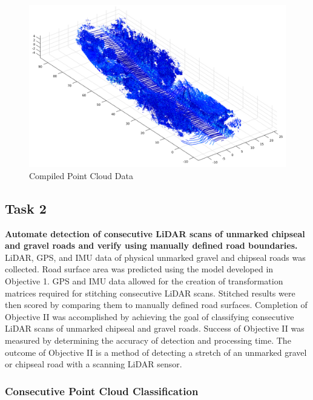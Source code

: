 \documentclass[numbered,pdftex]{ohio-etd}
\begin{document}
{{{{				\begin{figure}[H]
					\centering
					\includegraphics[width=0.7\linewidth]{Defense_Images/Compiled_PCD}
					\caption[Compiled Point Cloud Data]{Compiled Point Cloud Data}
					\label{fig:Compiled_PCD}
				\end{figure}
				
			} %

		
		} %
		
		\subsection{Task 2}\label{sec:Objective_2_Task_2}{
		
			{\textbf{Automate detection of consecutive LiDAR scans of unmarked chipseal and gravel roads and verify using manually defined road boundaries.} LiDAR, GPS, and IMU data of physical unmarked gravel and chipseal roads was collected. Road surface area was predicted using the model developed in Objective 1. GPS and IMU data allowed for the creation of transformation matrices required for stitching consecutive LiDAR scans. Stitched results were then scored by comparing them to manually defined road surfaces. Completion of Objective II was accomplished by achieving the goal of classifying consecutive LiDAR scans of unmarked chipseal and gravel roads. Success of Objective II was measured by determining the accuracy of detection and processing time. The outcome of Objective II is a method of detecting a stretch of an unmarked gravel or chipseal road with a scanning LiDAR sensor.}
			
			\subsubsection{Consecutive Point Cloud Classification}\label{sec:consecutive_point_cloud_classification}{
			
}}}}
\end{document}

